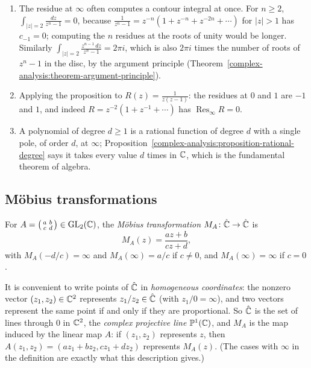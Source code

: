 \begin{example}\label{complex-analysis:example-residue-infinity}
\begin{enumerate}
\item The residue at $\infty$ often computes a contour integral at once. For $n \geq 2$, $\int_{|z| = 2}\frac{dz}{z^n - 1} = 0$, because $\frac{1}{z^n - 1} = z^{-n}(1 + z^{-n} + z^{-2n} + \cdots)$ for $|z| > 1$ has
$c_{-1} = 0$; computing the $n$ residues at the roots of unity would be longer. Similarly $\int_{|z| = 2}\frac{z^{n-1}\,dz}{z^n - 1} = 2\pi i$, which is also $2\pi i$ times the number of roots of $z^n - 1$ in the
disc, by the argument principle (Theorem~\ref{complex-analysis:theorem-argument-principle}).
\item Applying the proposition to $R(z) = \frac{1}{z(z - 1)}$: the residues at $0$ and $1$ are $-1$ and $1$, and indeed $R = z^{-2}(1 + z^{-1} + \cdots)$ has $\operatorname{Res}_\infty R = 0$.
\item A polynomial of degree $d \geq 1$ is a rational function of degree $d$ with a single pole, of order $d$, at $\infty$; Proposition~\ref{complex-analysis:proposition-rational-degree} says it takes every value $d$
times in $\mathbb{C}$, which is the fundamental theorem of algebra.
\end{enumerate}
\end{example}

\subsection{M\"obius transformations}\label{complex-analysis:subsection-mobius}

\begin{definition}\label{complex-analysis:definition-mobius}
For $A = \bigl(\begin{smallmatrix}a & b\\ c & d\end{smallmatrix}\bigr) \in \mathrm{GL}_2(\mathbb{C})$, the \emph{M\"obius transformation} $M_A \colon \hat{\mathbb{C}} \to \hat{\mathbb{C}}$ is
\[
M_A(z) = \frac{az + b}{cz + d},
\]
with $M_A(-d/c) = \infty$ and $M_A(\infty) = a/c$ if $c \neq 0$, and $M_A(\infty) = \infty$ if $c = 0$.
\end{definition}

It is convenient to write points of $\hat{\mathbb{C}}$ in \emph{homogeneous coordinates}: the nonzero vector $(z_1, z_2) \in \mathbb{C}^2$ represents $z_1/z_2 \in \hat{\mathbb{C}}$ (with $z_1/0 = \infty$), and two vectors represent the same
point if and only if they are proportional. So $\hat{\mathbb{C}}$ is the set of lines through $0$ in $\mathbb{C}^2$, the \emph{complex projective line} $\mathbb{P}^1(\mathbb{C})$, and $M_A$ is the map induced by the linear map $A$: if
$(z_1, z_2)$ represents $z$, then $A(z_1, z_2) = (az_1 + bz_2, cz_1 + dz_2)$ represents $M_A(z)$. (The cases with $\infty$ in the definition are exactly what this description gives.)

